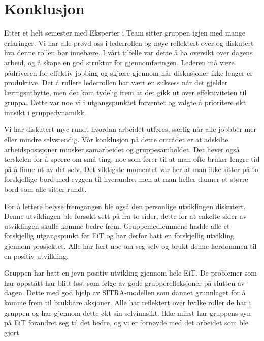 \chapter{Konklusjon}

Etter et helt semester med Eksperter i Team sitter gruppen igjen med mange erfaringer. 
Vi har alle prøvd oss i lederrollen og nøye reflektert over og diskutert hva denne rollen bør innebære. 
I vårt tilfelle var dette å ha oversikt over dagens arbeid, og å skape en god struktur for gjennomføringen. 
Lederen må være pådriveren for effektiv jobbing og skjære gjennom når diskusjoner ikke lenger er produktive. 
Det å rullere lederrollen har vært en suksess når det gjelder læringsutbytte, men det kom tydelig frem at det gikk ut over effektiviteten til gruppa. 
Dette var noe vi i utgangspunktet forventet og valgte å prioritere økt innsikt i gruppedynamikk.
\vspace{\secspace}

Vi har diskutert mye rundt hvordan arbeidet utføres, særlig når alle jobbber mer eller mindre selvstendig. 
Vår konklusjon på dette området er at adskilte arbeidsposisjoner minsker samarbeidet og gruppesamholdet.
Det hever også terskelen for å spørre om små ting, noe som fører til at man ofte bruker lengre tid på å finne ut av det selv.
Det viktigste momentet var her at man ikke sitter på to forskjellige bord med ryggen til hverandre, men at man heller danner et større bord som alle sitter rundt.
\vspace{\secspace}

For å lettere belyse fremgangen ble også den personlige utviklingen diskutert. 
Denne utviklingen ble forsøkt sett på fra to sider, dette for at enkelte sider av utviklingen skulle komme bedre frem.
Gruppemedlemmene hadde alle et forskjellig utgangspunkt før EiT og har derfor hatt en forskjellig utvikling gjennom prosjektet. 
Alle har lært noe om seg selv og brukt denne lærdommen til en positiv utvilkling.
\vspace{\secspace}

Gruppen har hatt en jevn positiv utvikling gjennom hele EiT. 
De problemer som har oppstått har blitt løst som følge av gode grupperefleksjoner på slutten av dagen. 
Dette med god hjelp av SITRA-modellen som dannet grunnlaget for å komme frem til brukbare aksjoner. 
Alle har reflektert over hvilke roller de har i gruppen og har gjennom dette økt sin selvinnsikt.
Ikke minst har gruppens syn på EiT forandret seg til det bedre, og vi er fornøyde med det arbeidet som ble gjort. 
